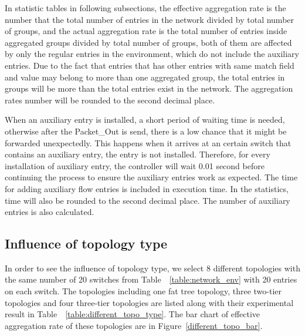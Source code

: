 In statistic tables in following subsections, the effective aggregation rate is the number that the total number of entries in the network divided by total number of groups, and the actual aggregation rate is the total number of entries inside aggregated groups divided by total number of groups, both of them are affected by only the regular entries in the environment, which do not include the auxiliary entries. Due to the fact that entries that has other entries with same match field and value may belong to more than one aggregated group, the total entries in groups will be more than the total entries exist in the network. The aggregation rates number will be rounded to the second decimal place.

When an auxiliary entry is installed, a short period of waiting time is needed, otherwise after the Packet\_Out is send, there is a low chance that it might be forwarded unexpectedly. This happens when it arrives at an certain switch that contains an auxiliary entry, the entry is not installed. Therefore, for every installation of auxiliary entry, the controller will wait 0.01 second before continuing the process to ensure the auxiliary entries work as expected. The time for adding auxiliary flow entries is included in execution time. In the statistics, time will also be rounded to the second decimal place. The number of auxiliary entries is also calculated.

\subsection{Influence of topology type}
In order to see the influence of topology type, we select 8 different topologies with the same number of 20 switches from Table~~\ref{table:network_env} with 20 entries on each switch. The topologies including one fat tree topology, three two-tier topologies and four three-tier topologies are listed along with their experimental result in Table~~\ref{table:different_topo_type}. The bar chart of effective aggregation rate of these topologies are in Figure~\ref{different_topo_bar}.

